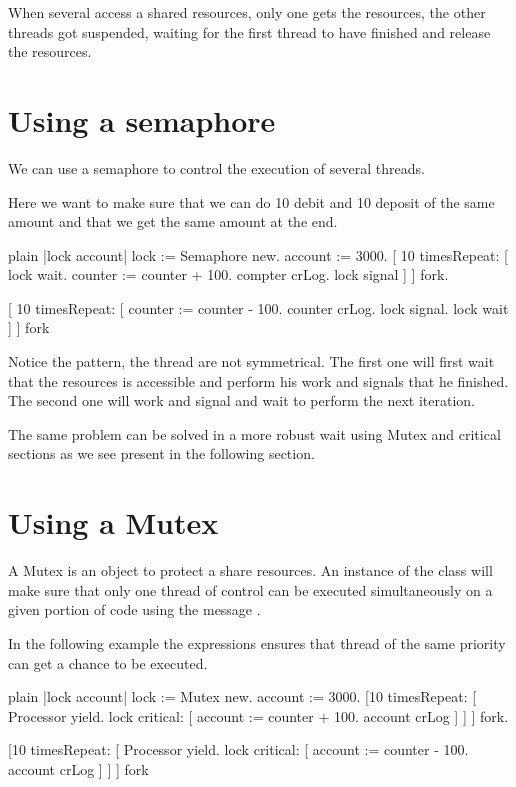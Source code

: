 \documentclass[10pt,twoside,english]{_support/latex/sbabook/sbabook}
\begin{document}
When several access a shared resources, only one gets the resources, the other threads got suspended, waiting for the first thread to have finished and release the resources.
\section{Using a semaphore}
We can use a semaphore to control the execution of several threads. 

Here we want to make sure that we can do 10 debit and 10 deposit of the same amount and that we get the same amount at the end. 

\begin{displaycode}{plain}
|lock account|
lock := Semaphore new.
account := 3000.
[ 10 timesRepeat: [
	lock wait.
	counter := counter + 100.
	compter crLog.
	lock signal ]
	] fork.
	
[ 10 timesRepeat: [
	counter := counter - 100.
	counter crLog. 
	lock signal. 
	lock wait ]
	] fork
\end{displaycode}

Notice the pattern, the thread are not symmetrical. 
The first one will first wait that the resources is accessible and perform his work 
and signals that he finished. 
The second one will work and signal and wait to perform the next iteration.

The same problem can be solved in a more robust wait using Mutex and critical sections
as we see present in the following section.
\section{Using a Mutex}
A Mutex is an object to protect a share resources. An instance of the class  will make sure that only one thread of control can be executed simultaneously on a given portion of code using the message .

In the following example the expressions  ensures that thread of the same priority can get a chance to be executed. 

\begin{displaycode}{plain}
|lock account|
lock := Mutex new.
account := 3000.
[10 timesRepeat: [ Processor yield.
	lock critical: [ account := counter + 100.
					account crLog ] ]
	] fork.

[10 timesRepeat: [ Processor yield.
	lock critical: [ account := counter - 100.
					account crLog ] ]
	] fork
\end{displaycode}
\end{document}
